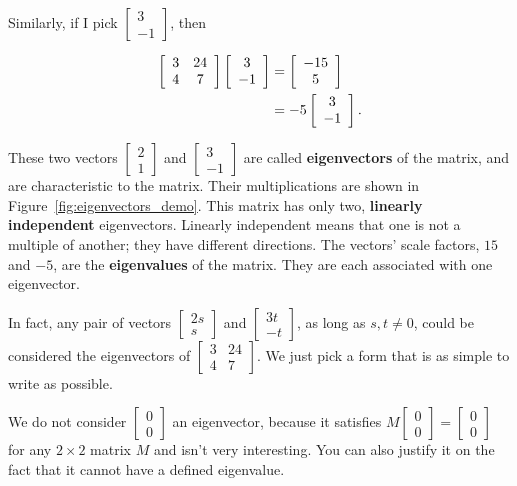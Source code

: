 \documentclass[../textbook.tex]{subfiles}
\begin{document}
\noindent Similarly, if I pick $\left[\begin{array}{c}3 \\ -1\end{array}\right]$, then 

\begin{align*}
\left[\begin{array}{cc} 3 & 24 \\ 4 & 7 \end{array}\right]\left[\begin{array}{c} 3 \\ -1 \end{array}\right]&=\left[\begin{array}{c} -15 \\ 5 \end{array}\right] \\
&= -5\left[\begin{array}{c} 3 \\ -1 \end{array}\right].
\end{align*}

\noindent These two vectors $\left[\begin{array}{c}2 \\ 1 \end{array}\right]$ and $\left[\begin{array}{c} 3 \\ -1 \end{array}\right]$ are called \textbf{eigenvectors} of the matrix, and are characteristic to the matrix. Their multiplications are shown in Figure~\ref{fig:eigenvectors_demo}. This matrix has only two, \textbf{linearly independent} eigenvectors. Linearly independent means that one is not a multiple of another; they have different directions. The vectors' scale factors, $15$ and $-5$, are the \textbf{eigenvalues} of the matrix. They are each associated with one eigenvector.

In fact, any pair of vectors $\left[\begin{array}{c}2s \\ s \end{array}\right]$ and $\left[\begin{array}{c} 3t \\ -t \end{array}\right]$, as long as $s,t\neq 0$, could be considered the eigenvectors of $\left[\begin{array}{cc}3 & 24 \\ 4 & 7\end{array}\right]$. We just pick a form that is as simple to write as possible.

We do not consider $\left[\begin{array}{c} 0 \\ 0 \end{array}\right]$ an eigenvector, because it satisfies $M\left[\begin{array}{c} 0 \\ 0 \end{array}\right]=\left[\begin{array}{c} 0 \\ 0 \end{array}\right]$ for any $2\times 2$ matrix $M$ and isn't very interesting. You can also justify it on the fact that it cannot have a defined eigenvalue.
\end{document}

